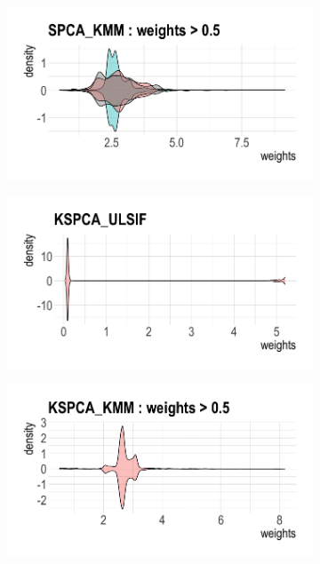 \documentclass[a4paper,12pt]{article}
\begin{document}
\begin{figure}[H]
\begin{subfigure}{.32\textwidth}
  \label{fig:sfig1}
\end{subfigure}
\begin{subfigure}{.32\textwidth}
  \centering
  \includegraphics[width=\linewidth]{bio9.png}
  \label{fig:sfig2}
\end{subfigure} %
\begin{subfigure}{.32\textwidth}
  \centering
  \includegraphics[width=\linewidth]{bio6.png}
  \label{fig:sfig1}
\end{subfigure}%
\begin{subfigure}{.32\textwidth}
  \centering
  \includegraphics[width=\linewidth]{bio10.png}

\end{subfigure}
\end{figure}
\end{document}
